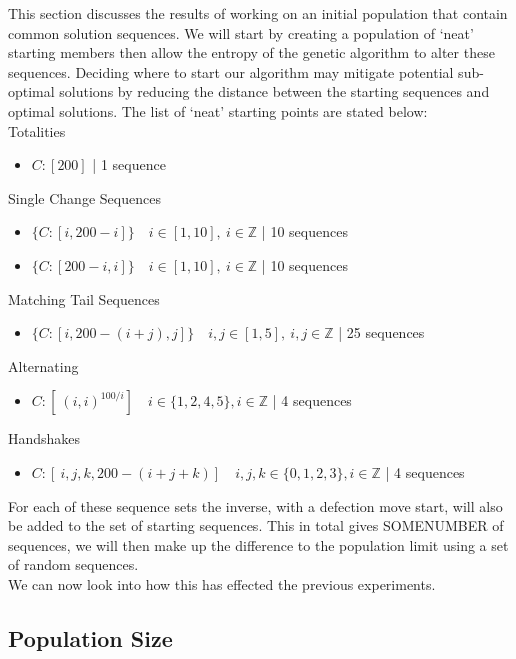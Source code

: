 This section discusses the results of working on an initial population that contain common solution sequences.
We will start by creating a population of `neat' starting members then allow the entropy of the genetic algorithm to alter these sequences.
Deciding where to start our algorithm may mitigate potential sub-optimal solutions by reducing the distance between the starting sequences and optimal solutions.
The list of `neat' starting points are stated below:\\

Totalities
\begin{itemize}
    \item \(C:[200]\) | 1 sequence
\end{itemize}

Single Change Sequences
\begin{itemize}
    \item \(\{C:[i,200-i]\} \quad i\in [1,10],\ i \in \mathbb{Z}\) | 10 sequences
    \item \(\{C:[200-i,i]\} \quad i\in [1,10],\ i \in \mathbb{Z}\) | 10 sequences
\end{itemize}

Matching Tail Sequences
\begin{itemize}
    \item \(\{C:[i,200-(i+j),j]\} \quad i,j \in [1,5],\ i,j \in \mathbb{Z}\) | 25 sequences
\end{itemize}

Alternating
\begin{itemize}
    \item \(C:[\ (i,i)^{100/i}] \quad i \in \{1,2,4,5\}, i \in \mathbb{Z}\) | 4 sequences
\end{itemize}

Handshakes
\begin{itemize}
    \item \(C:[\ i,j,k,200-(i+j+k)] \quad i,j,k \in \{0,1,2,3\}, i \in \mathbb{Z}\) | 4 sequences
\end{itemize}

For each of these sequence sets the inverse, with a defection move start, will also be added to the set of starting sequences.
This in total gives SOMENUMBER of sequences, we will then make up the difference to the population limit using a set of random sequences.\\

We can now look into how this has effected the previous experiments.

\subsection{Population Size}

